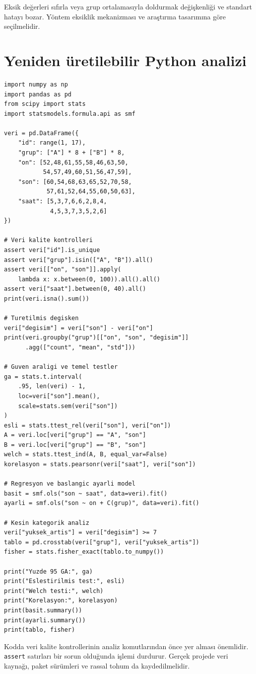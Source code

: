 Eksik değerleri sıfırla veya grup ortalamasıyla doldurmak değişkenliği ve
standart hatayı bozar. Yöntem eksiklik mekanizması ve araştırma tasarımına göre
seçilmelidir.

\section{Yeniden üretilebilir Python analizi}

\begin{lstlisting}
import numpy as np
import pandas as pd
from scipy import stats
import statsmodels.formula.api as smf

veri = pd.DataFrame({
    "id": range(1, 17),
    "grup": ["A"] * 8 + ["B"] * 8,
    "on": [52,48,61,55,58,46,63,50,
           54,57,49,60,51,56,47,59],
    "son": [60,54,68,63,65,52,70,58,
            57,61,52,64,55,60,50,63],
    "saat": [5,3,7,6,6,2,8,4,
             4,5,3,7,3,5,2,6]
})

# Veri kalite kontrolleri
assert veri["id"].is_unique
assert veri["grup"].isin(["A", "B"]).all()
assert veri[["on", "son"]].apply(
    lambda x: x.between(0, 100)).all().all()
assert veri["saat"].between(0, 40).all()
print(veri.isna().sum())

# Turetilmis degisken
veri["degisim"] = veri["son"] - veri["on"]
print(veri.groupby("grup")[["on", "son", "degisim"]]
      .agg(["count", "mean", "std"]))

# Guven araligi ve temel testler
ga = stats.t.interval(
    .95, len(veri) - 1,
    loc=veri["son"].mean(),
    scale=stats.sem(veri["son"])
)
esli = stats.ttest_rel(veri["son"], veri["on"])
A = veri.loc[veri["grup"] == "A", "son"]
B = veri.loc[veri["grup"] == "B", "son"]
welch = stats.ttest_ind(A, B, equal_var=False)
korelasyon = stats.pearsonr(veri["saat"], veri["son"])

# Regresyon ve baslangic ayarli model
basit = smf.ols("son ~ saat", data=veri).fit()
ayarli = smf.ols("son ~ on + C(grup)", data=veri).fit()

# Kesin kategorik analiz
veri["yuksek_artis"] = veri["degisim"] >= 7
tablo = pd.crosstab(veri["grup"], veri["yuksek_artis"])
fisher = stats.fisher_exact(tablo.to_numpy())

print("Yuzde 95 GA:", ga)
print("Eslestirilmis test:", esli)
print("Welch testi:", welch)
print("Korelasyon:", korelasyon)
print(basit.summary())
print(ayarli.summary())
print(tablo, fisher)
\end{lstlisting}

Kodda veri kalite kontrollerinin analiz komutlarından önce yer alması
önemlidir. \texttt{assert} satırları bir sorun olduğunda işlemi durdurur.
Gerçek projede veri kaynağı, paket sürümleri ve rassal tohum da kaydedilmelidir.


